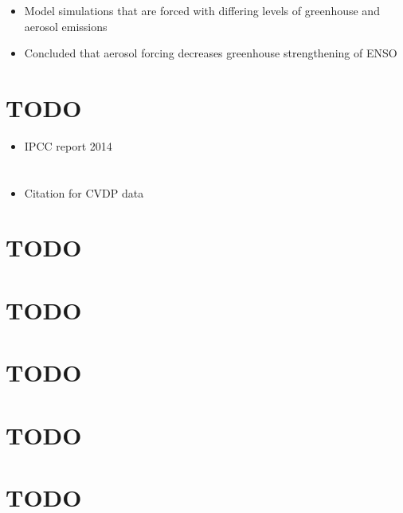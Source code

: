 \documentclass[11pt]{article}
\begin{document}
\begin{itemize}
\item Model simulations that are forced with differing levels of greenhouse and aerosol emissions
\item Concluded that aerosol forcing decreases greenhouse strengthening of ENSO
\end{itemize}

\section{{\bfseries\sffamily TODO} \cite{pachauri2014climate}}
\label{sec:orgb3ac32a}

\begin{itemize}
\item IPCC report 2014
\end{itemize}

\section{\cite{phillips2014evaluating}}
\label{sec:orgc0ab115}

\begin{itemize}
\item Citation for CVDP data
\end{itemize}

\section{{\bfseries\sffamily TODO} \cite{rashid2016atmospheric}}
\label{sec:org826e0bc}
\section{{\bfseries\sffamily TODO} \cite{ropelewski1987global}}
\label{sec:orgc7c5d50}
\section{{\bfseries\sffamily TODO} \cite{son2010impact}}
\label{sec:org8390afa}
\section{{\bfseries\sffamily TODO} \cite{stevenson2010enso}}
\label{sec:org7d57c16}
\section{{\bfseries\sffamily TODO} \cite{stevenson2012will}}
\label{sec:orge0c0888}
\end{document}
